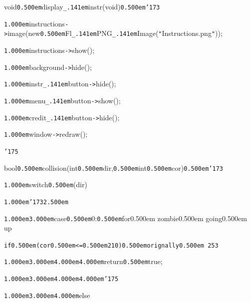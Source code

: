 \documentclass[12pt]{article}
\begin{document}
\noindent
{}void{\tt\mc \kern0.500em}display{\tt\_\kern.141em}instr(void{\tt *}){\tt\mc \kern0.500em}{\tt\char'173}

\noindent
{}{\tt\mc \kern1.000em}instructions{\tt -}{\tt >}image(new{\tt\mc \kern0.500em}Fl{\tt\_\kern.141em}PNG{\tt\_\kern.141em}Image({\tt "}Instructions.png{\tt "}));

\noindent
{}{\tt\mc \kern1.000em}instructions{\tt -}{\tt >}show();

\noindent
{}{\tt\mc \kern1.000em}background{\tt -}{\tt >}hide();

\noindent
{}{\tt\mc \kern1.000em}instr{\tt\_\kern.141em}button{\tt -}{\tt >}hide();

\noindent
{}{\tt\mc \kern1.000em}menu{\tt\_\kern.141em}button{\tt -}{\tt >}show();

\noindent
{}{\tt\mc \kern1.000em}credit{\tt\_\kern.141em}button{\tt -}{\tt >}hide();

\noindent
{}{\tt\mc \kern1.000em}window{\tt -}{\tt >}redraw();

\noindent
{}{\tt\char'175}

\noindent
{}\hfill

\noindent
{}bool{\tt\mc \kern0.500em}collision(int{\tt\mc \kern0.500em}dir,{\tt\mc \kern0.500em}int{\tt\mc \kern0.500em}cor){\tt\mc \kern0.500em}{\tt\char'173}

\noindent
{}{\tt\mc \kern1.000em}switch{\tt\mc \kern0.500em}(dir)

\noindent
{}{\tt\mc \kern1.000em}{\tt\char'173}{\tt\mc \kern2.500em}

\noindent
{}{\tt\mc \kern1.000em}{\tt\mc \kern3.000em}case{\tt\mc \kern0.500em}0:{\tt\mc \kern0.500em}\rm\mc {\tt /}{\tt /}for\kern0.500em zombie\kern0.500em going\kern0.500em up

\noindent
\tt\mc {\tt\mc \kern1.000em}{\tt\mc \kern3.000em}if{\tt\mc \kern0.500em}(cor{\tt\mc \kern0.500em}{\tt <}={\tt\mc \kern0.500em}210){\tt\mc \kern0.500em}\rm\mc {\tt /}{\tt /}orignally\kern0.500em 253

\noindent
\tt{}

\noindent
{}{\tt\mc \kern1.000em}{\tt\mc \kern3.000em}{\tt\mc \kern4.000em}{\tt\mc \kern4.000em}return{\tt\mc \kern0.500em}true;

\noindent
{}{\tt\mc \kern1.000em}{\tt\mc \kern3.000em}{\tt\mc \kern4.000em}{\tt\mc \kern4.000em}{\tt\char'175}

\noindent
{}{\tt\mc \kern1.000em}{\tt\mc \kern3.000em}{\tt\mc \kern4.000em}else
\end{document}
